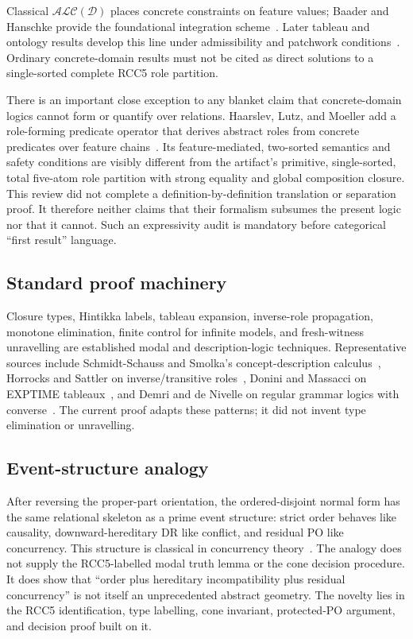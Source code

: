 \documentclass[11pt]{article}
\begin{document}
Classical $\mathcal{ALC}(\mathcal D)$ places concrete constraints on feature values;
Baader and Hanschke provide the foundational integration scheme~\cite{BaaderHanschke1991}.
Later tableau and ontology results develop this line under admissibility and patchwork
conditions~\cite{LutzMilicic2007,BaaderRydval2020}. Ordinary concrete-domain results
must not be cited as direct solutions to a single-sorted complete RCC5 role partition.

There is an important close exception to any blanket claim that concrete-domain logics
cannot form or quantify over relations. Haarslev, Lutz, and Moeller add a
role-forming predicate operator that derives abstract roles from concrete predicates
over feature chains~\cite{HaarslevLutzMoeller1999}. Its feature-mediated, two-sorted
semantics and safety conditions are visibly different from the artifact's primitive,
single-sorted, total five-atom role partition with strong equality and global
composition closure. This review did not complete a definition-by-definition
translation or separation proof. It therefore neither claims that their formalism
subsumes the present logic nor that it cannot. Such an expressivity audit is mandatory
before categorical ``first result'' language.

\subsection{Standard proof machinery}

Closure types, Hintikka labels, tableau expansion, inverse-role propagation, monotone
elimination, finite control for infinite models, and fresh-witness unravelling are
established modal and description-logic techniques. Representative sources include
Schmidt-Schauss and Smolka's concept-description calculus~\cite{SchmidtSchaussSmolka1991},
Horrocks and Sattler on inverse/transitive roles~\cite{HorrocksSattler1999}, Donini and
Massacci on EXPTIME tableaux~\cite{DoniniMassacci2000}, and Demri and de Nivelle on
regular grammar logics with converse~\cite{DemriDeNivelle2005}. The current proof
adapts these patterns; it did not invent type elimination or unravelling.

\subsection{Event-structure analogy}

After reversing the proper-part orientation, the ordered-disjoint normal form has the
same relational skeleton as a prime event structure: strict order behaves like
causality, downward-hereditary DR like conflict, and residual PO like concurrency.
This structure is classical in concurrency theory~\cite{NielsenPlotkinWinskel1981,Winskel1987}.
The analogy does not supply the RCC5-labelled modal truth lemma or the cone decision
procedure. It does show that ``order plus hereditary incompatibility plus residual
concurrency'' is not itself an unprecedented abstract geometry. The novelty lies in
the RCC5 identification, type labelling, cone invariant, protected-PO argument, and
decision proof built on it.
\end{document}
